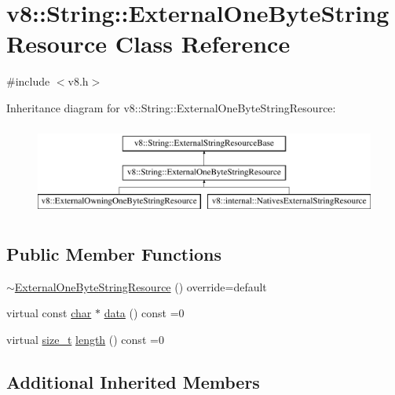 \hypertarget{classv8_1_1String_1_1ExternalOneByteStringResource}{}\section{v8\+:\+:String\+:\+:External\+One\+Byte\+String\+Resource Class Reference}
\label{classv8_1_1String_1_1ExternalOneByteStringResource}


{\ttfamily \#include $<$v8.\+h$>$}

Inheritance diagram for v8\+:\+:String\+:\+:External\+One\+Byte\+String\+Resource\+:\begin{figure}[H]
\begin{center}
\leavevmode
\includegraphics[height=3.000000cm]{classv8_1_1String_1_1ExternalOneByteStringResource}
\end{center}
\end{figure}
\subsection*{Public Member Functions}
\begin{DoxyCompactItemize}
\item 
\mbox{\hyperlink{classv8_1_1String_1_1ExternalOneByteStringResource_ac75c47722e5602b863cbc880dc4f5b7c}{$\sim$\+External\+One\+Byte\+String\+Resource}} () override=default
\item 
virtual const \mbox{\hyperlink{classchar}{char}} $\ast$ \mbox{\hyperlink{classv8_1_1String_1_1ExternalOneByteStringResource_aaeca31240d3dbf990d1b974e3c64593e}{data}} () const =0
\item 
virtual \mbox{\hyperlink{classsize__t}{size\+\_\+t}} \mbox{\hyperlink{classv8_1_1String_1_1ExternalOneByteStringResource_ad6b702f05798bcfc3975cb922f32b5ab}{length}} () const =0
\end{DoxyCompactItemize}
\subsection*{Additional Inherited Members}



